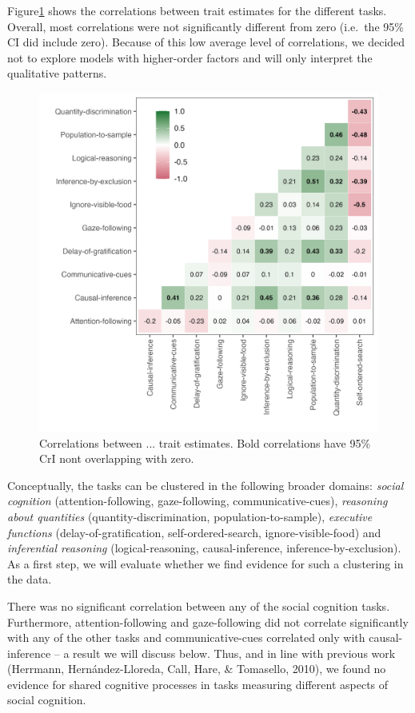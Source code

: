 \documentclass[
  man,floatsintext]{apa6}
\begin{document}
Figure\ref{fig:figcor} shows the correlations between trait estimates for the different tasks. Overall, most correlations were not significantly different from zero (i.e.~the 95\% CI did include zero). Because of this low average level of correlations, we decided not to explore models with higher-order factors and will only interpret the qualitative patterns.

\begin{figure}

{\centering \includegraphics[width=0.7\linewidth]{../visuals/task_level_cor} 

}

\caption{Correlations between ... trait estimates. Bold correlations have 95\% CrI nont overlapping with zero.}\label{fig:figcor}
\end{figure}

Conceptually, the tasks can be clustered in the following broader domains: \emph{social cognition} (attention-following, gaze-following, communicative-cues), \emph{reasoning about quantities} (quantity-discrimination, population-to-sample), \emph{executive functions} (delay-of-gratification, self-ordered-search, ignore-visible-food) and \emph{inferential reasoning} (logical-reasoning, causal-inference, inference-by-exclusion). As a first step, we will evaluate whether we find evidence for such a clustering in the data.

There was no significant correlation between any of the social cognition tasks. Furthermore, attention-following and gaze-following did not correlate significantly with any of the other tasks and communicative-cues correlated only with causal-inference -- a result we will discuss below. Thus, and in line with previous work (Herrmann, Hernández-Lloreda, Call, Hare, \& Tomasello, 2010), we found no evidence for shared cognitive processes in tasks measuring different aspects of social cognition.
\end{document}
